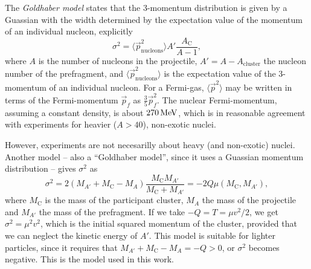 The \emph{Goldhaber model} states that the 3-momentum distribution is given by a Guassian with the width determined by the expectation value of the momentum of an individual nucleon, explicitly
\begin{equation}
\sigma^2 = \langle \vec{p}_\text{nucleons}^2 \rangle A'\frac{A_\text{C}}{A-1},
\end{equation}
where $A$ is the number of nucleons in the projectile, $A' = A-A_\text{cluster}$ the nucleon number of the prefragment, and $\langle \vec{p}_\text{nucleons}^2 \rangle$ is the expectation value of the 3-momentum of an individual nucleon. For a Fermi-gas, $\langle \vec{p}^2 \rangle$ may be written in terms of the Fermi-momentum $\vec{p}_f$ as $\tfrac{3}{5} \vec{p}_f^2$\cite{goldhaber:1974:art}.
The nuclear Fermi-momentum, assuming a constant density, is about $\unit[270]{MeV}$, which is in reasonable agreement with experiments for heavier ($A>40$), non-exotic nuclei\cite{moniz:1971}. 

However, \rtb{} experiments are not necesarilly about heavy (and non-exotic) nuclei. Another model -- also a ``Goldhaber model'', since it uses a Guassian momentum distribution -- gives $\sigma^2$ as
\begin{equation}
\sigma^2 = 2 (M_{A'} + M_\text{C} -M_A) \frac{M_\text{C}M_{A'}}{M_\text{C}+M_{A'}} = -2 Q \mu(M_\text{C},M_{A'}),
\end{equation}
where $M_\text{C}$ is the mass of the participant cluster, $M_A$ the mass of the projectile and $M_{A'}$ the mass of the prefragment. If we take $-Q=T = \mu v^2/2$, we get $\sigma^2 = \mu^2 v^2$, which is the initial squared momentum of the cluster, provided that we can neglect the kinetic energy of $A'$. This model is suitable for lighter particles, since it requires that $M_{A'} + M_\text{C} -M_A = -Q >0$, or $\sigma^2$ becomes negative. This is the model used in this work.

